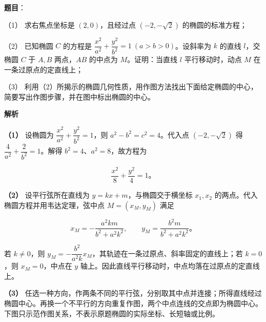 \begin{answer}

\textbf{题目}：

（1） 求右焦点坐标是 $(2,0)$，且经过点 $(-2,-\sqrt2)$ 的椭圆的标准方程；

（2） 已知椭圆 $C$ 的方程是 $\dfrac{x^2}{a^2}+\dfrac{y^2}{b^2}=1\ (a>b>0)$。设斜率为 $k$ 的直线 $l$，交椭圆 $C$ 于 $A,B$ 两点，$AB$ 的中点为 $M$。证明：当直线 $l$ 平行移动时，动点 $M$ 在一条过原点的定直线上；

（3） 利用（2）所揭示的椭圆几何性质，用作图方法找出下面给定椭圆的中心，简要写出作图步骤，并在图中标出椭圆的中心。
\nopagebreak[4]
\begin{center}\end{center}
\nopagebreak[4]
\textbf{解析}

\textbf{（1）} 设椭圆为 $\dfrac{x^2}{a^2}+\dfrac{y^2}{b^2}=1$，则 $a^2-b^2=c^2=4$。代入点 $(-2,-\sqrt2)$ 得 $\dfrac4{a^2}+\dfrac2{b^2}=1$。解得 $b^2=4$、$a^2=8$，故方程为

\nopagebreak[4]
\[
\frac{x^2}{8}+\frac{y^2}{4}=1\mbox{。}
\]

\textbf{（2）} 设平行弦所在直线为 $y=kx+m$，与椭圆交于横坐标 $x_1,x_2$ 的两点。代入椭圆方程并用韦达定理，弦中点 $M=(x_M,y_M)$ 满足

\nopagebreak[4]
\[
x_M=-\frac{a^2km}{b^2+a^2k^2},\qquad
y_M=\frac{b^2m}{b^2+a^2k^2}\mbox{。}
\]

若 $k\ne0$，则 $y_M=-\dfrac{b^2}{a^2k}x_M$，其轨迹在一条过原点、斜率固定的直线上；若 $k=0$，则 $x_M=0$，中点在 $y$ 轴上。因此直线平行移动时，中点均落在过原点的定直线上。

\textbf{（3）} 任选一种方向，作两条不同的平行弦，分别取其中点并连接；所得直线经过椭圆中心。再换一个不平行的方向重复作图，两个中点连线的交点即为椭圆中心。下图只示范作图关系，不表示原题椭圆的实际坐标、长短轴或比例。
\nopagebreak[4]
\begin{center}\end{center}
\nopagebreak[4]



\end{answer}